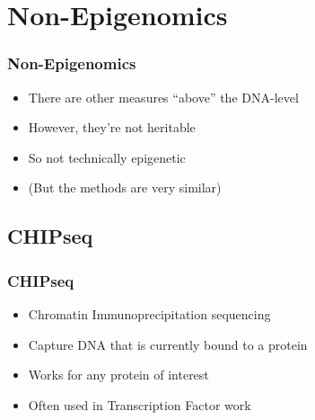 \documentclass[14pt]{beamer}
\begin{document}
\section{Non-Epigenomics}

\begin{frame}
\frametitle{Non-Epigenomics}
\begin{itemize}
	\item<+-> There are other measures ``above'' the DNA-level
	\item<+-> However, they're not heritable
	\item<+-> So not technically epigenetic
	\item<+-> (But the methods are very similar)
\end{itemize}
\end{frame}

\subsection{CHIPseq}

\begin{frame}
\frametitle{CHIPseq}
\begin{itemize}
	\item<+-> Chromatin Immunoprecipitation sequencing
	\item<+-> Capture DNA that is currently bound to a protein
	\item<+-> Works for any protein of interest
	\item<+-> Often used in Transcription Factor work
\end{itemize}
\end{frame}
\end{document}
